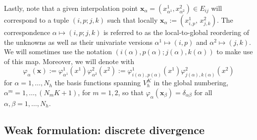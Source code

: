 \documentclass[a4paper,10pt]{article}
\begin{document}
 
Lastly, note that a given  interpolation point $\mathbf{x}_{\alpha}=(x^1_{\alpha^1},x^2_{\alpha^2})\in E_{ij}$   will correspond to a tuple $(i,p;j,k)$ such that locally 
 $\mathbf{x}_{\alpha}:=( x^{1}_{i,p},\, x^{2}_{j,k} )$. The correspondence $\alpha\mapsto (i, p; j,k) $ is referred to as the local-to-global
reordering of the unknowns as well as their univariate versions $\alpha^1 \mapsto (i,p)$ and $\alpha^2 \mapsto (j,k)$. We will sometimes use the notation $(i(\alpha),p(\alpha); j(\alpha), k(\alpha))$ to make use of this  map. 
Moreover, we will denote with 
\begin{equation}
\varphi_\alpha(\mathbf{x}) :=\varphi^1_{\alpha^1}(x^1)\varphi^2_{\alpha^2}(x^2):=  \varphi^1_{i(\alpha),p(\alpha)}(x^1)\varphi^2_{j(\alpha),k(\alpha)}(x^2)
\end{equation}
for $\alpha =1,\dots, N_h$ the basis functions spanning $V^K_h$ in the global numbering, $\alpha^m = 1,\dots, (N_mK+1)$, for $m=1,2$, so that $\varphi_\alpha(\mathbf{x}_\beta) = \delta_{\alpha\beta}$ for all $\alpha,\beta =1,\dots, N_h$.
 


\subsection{Weak formulation: discrete divergence}
\end{document}
